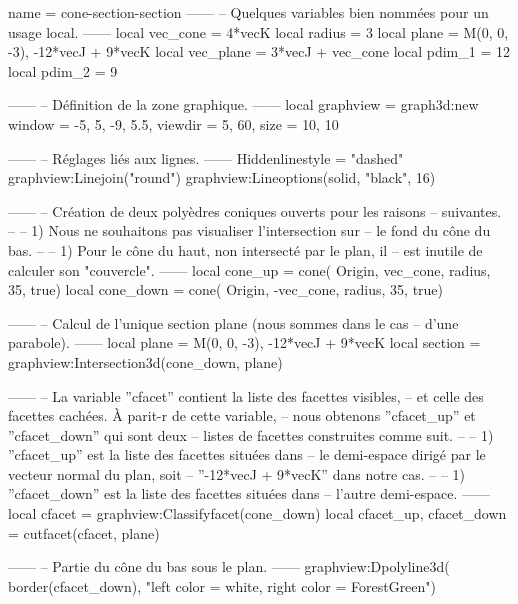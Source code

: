 \documentclass[border = 3pt]{standalone}
\begin{document}
\begin{luadraw}{name = cone-section-section}
------
-- Quelques variables bien nommées pour un usage local.
------
    local vec_cone  = 4*vecK
    local radius    = 3
    local plane     = {M(0, 0, -3), -12*vecJ + 9*vecK}
    local vec_plane = 3*vecJ + vec_cone
    local pdim_1    = 12
    local pdim_2    = 9

------
-- Définition de la zone graphique.
------
    local graphview = graph3d:new{
        window  = {-5, 5, -9, 5.5},
        viewdir = {5, 60},
        size    = {10, 10}
    }

------
-- Réglages liés aux lignes.
------
    Hiddenlinestyle = "dashed"
    graphview:Linejoin("round")
    graphview:Lineoptions(solid, "black", 16)

------
-- Création de deux polyèdres coniques ouverts pour les raisons
-- suivantes.
--
--     1) Nous ne souhaitons pas visualiser l'intersection sur
--     le fond du cône du bas.
--
--     1) Pour le cône du haut, non intersecté par le plan, il
--     est inutile de calculer son "couvercle".
------
    local cone_up = cone(
        Origin, vec_cone, radius,
        35,
        true)
    local cone_down = cone(
        Origin, -vec_cone, radius,
        35,
        true)

------
-- Calcul de l'unique section plane (nous sommes dans le cas
-- d'une parabole).
------
    local plane   = {M(0, 0, -3), -12*vecJ + 9*vecK}
    local section = graphview:Intersection3d(cone_down, plane)

------
-- La variable ''cfacet'' contient la liste des facettes visibles,
-- et celle des facettes cachées. À parit-r de cette variable,
-- nous obtenons ''cfacet_up'' et ''cfacet_down'' qui sont deux
-- listes de facettes construites comme suit.
--
--     1) ''cfacet_up'' est la liste des facettes situées dans
--     le demi-espace dirigé par le vecteur normal du plan, soit
--     ''-12*vecJ + 9*vecK'' dans notre cas.
--
--     1) ''cfacet_down'' est la liste des facettes situées dans
--     l’autre demi-espace.
------
    local cfacet                 = graphview:Classifyfacet(cone_down)
    local cfacet_up, cfacet_down = cutfacet(cfacet, plane)

------
-- Partie du cône du bas sous le plan.
------
    graphview:Dpolyline3d(
        border(cfacet_down),
        "left color = white, right color = ForestGreen")


\end{luadraw}
\end{document}
